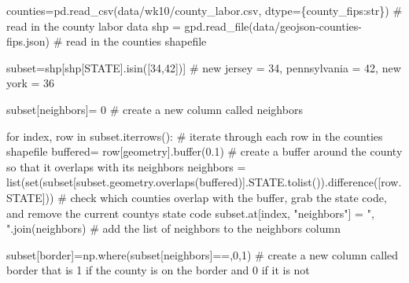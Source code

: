 \documentclass[
  letterpaper,
  DIV=11,
  numbers=noendperiod]{scrreprt}
\newenvironment{Shaded}{\begin{snugshade}}{\end{snugshade}}
\newcommand{\BuiltInTok}[1]{\textcolor[rgb]{0.00,0.23,0.31}{#1}}
\newcommand{\CommentTok}[1]{\textcolor[rgb]{0.37,0.37,0.37}{#1}}
\newcommand{\ControlFlowTok}[1]{\textcolor[rgb]{0.00,0.23,0.31}{#1}}
\newcommand{\DecValTok}[1]{\textcolor[rgb]{0.68,0.00,0.00}{#1}}
\newcommand{\FloatTok}[1]{\textcolor[rgb]{0.68,0.00,0.00}{#1}}
\newcommand{\KeywordTok}[1]{\textcolor[rgb]{0.00,0.23,0.31}{#1}}
\newcommand{\NormalTok}[1]{\textcolor[rgb]{0.00,0.23,0.31}{#1}}
\newcommand{\OperatorTok}[1]{\textcolor[rgb]{0.37,0.37,0.37}{#1}}
\newcommand{\StringTok}[1]{\textcolor[rgb]{0.13,0.47,0.30}{#1}}
\begin{document}
\begin{Shaded}
\begin{Highlighting}[]
\NormalTok{counties}\OperatorTok{=}\NormalTok{pd.read\_csv(}\StringTok{\textquotesingle{}data/wk10/county\_labor.csv\textquotesingle{}}\NormalTok{, dtype}\OperatorTok{=}\NormalTok{\{}\StringTok{\textquotesingle{}county\_fips\textquotesingle{}}\NormalTok{:}\BuiltInTok{str}\NormalTok{\}) }\CommentTok{\# read in the county labor data}
\NormalTok{shp }\OperatorTok{=}\NormalTok{ gpd.read\_file(}\StringTok{\textquotesingle{}data/geojson{-}counties{-}fips.json\textquotesingle{}}\NormalTok{) }\CommentTok{\# read in the counties shapefile}

\NormalTok{subset}\OperatorTok{=}\NormalTok{shp[shp[}\StringTok{\textquotesingle{}STATE\textquotesingle{}}\NormalTok{].isin([}\StringTok{\textquotesingle{}34\textquotesingle{}}\NormalTok{,}\StringTok{\textquotesingle{}42\textquotesingle{}}\NormalTok{])] }\CommentTok{\# new jersey = 34, pennsylvania = 42, new york = 36}

\NormalTok{subset[}\StringTok{\textquotesingle{}neighbors\textquotesingle{}}\NormalTok{]}\OperatorTok{=} \DecValTok{0} \CommentTok{\# create a new column called neighbors}

\ControlFlowTok{for}\NormalTok{ index, row }\KeywordTok{in}\NormalTok{ subset.iterrows():  }\CommentTok{\# iterate through each row in the counties shapefile}
\NormalTok{    buffered}\OperatorTok{=}\NormalTok{ row[}\StringTok{\textquotesingle{}geometry\textquotesingle{}}\NormalTok{].}\BuiltInTok{buffer}\NormalTok{(}\FloatTok{0.1}\NormalTok{) }\CommentTok{\# create a buffer around the county so that it overlaps with its neighbors}
\NormalTok{    neighbors }\OperatorTok{=} \BuiltInTok{list}\NormalTok{(}\BuiltInTok{set}\NormalTok{(subset[subset.geometry.overlaps(buffered)].STATE.tolist()).difference([row.STATE])) }\CommentTok{\# check which counties overlap with the buffer, grab the state code, and remove the current county\textquotesingle{}s state code}
\NormalTok{    subset.at[index, }\StringTok{"neighbors"}\NormalTok{] }\OperatorTok{=} \StringTok{", "}\NormalTok{.join(neighbors) }\CommentTok{\# add the list of neighbors to the neighbors column}

\NormalTok{subset[}\StringTok{\textquotesingle{}border\textquotesingle{}}\NormalTok{]}\OperatorTok{=}\NormalTok{np.where(subset[}\StringTok{\textquotesingle{}neighbors\textquotesingle{}}\NormalTok{]}\OperatorTok{==}\StringTok{\textquotesingle{}\textquotesingle{}}\NormalTok{,}\DecValTok{0}\NormalTok{,}\DecValTok{1}\NormalTok{) }\CommentTok{\# create a new column called border that is 1 if the county is on the border and 0 if it is not}


\end{Highlighting}
\end{Shaded}
\end{document}
